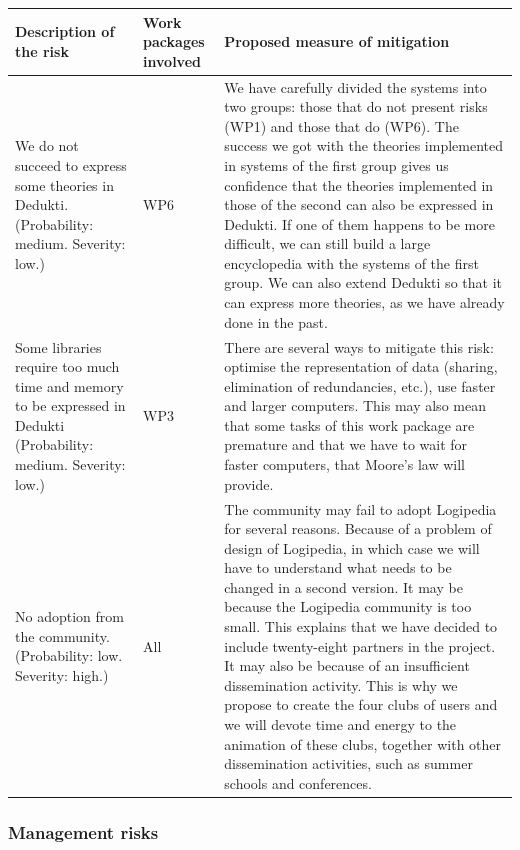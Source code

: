 \begin{longtable*}{|p{0.30\textwidth}|p{0.10\textwidth}|p{0.50\textwidth}|}
\hline
{\bf Description of the risk}
&
{\bf Work packages involved}
&
{\bf Proposed measure of mitigation}
\\
\hline
We do not succeed to express some theories in Dedukti.
(Probability: medium. Severity: low.)

&
WP6
&
We have carefully divided the systems into two groups: those that do not
present risks (WP1) and those that do (WP6). The success we got with the
theories implemented in systems of the first group gives us confidence
that the theories implemented in those of the second can also be
expressed in Dedukti.  If one of them happens to be more difficult, we
can still build a large encyclopedia with the systems of the first
group. We can also extend Dedukti so that it can express more theories,
as we have already done in the past.
\\
\hline
Some libraries require too much time and memory
to be expressed in Dedukti (Probability: medium. Severity: low.)
&
WP3
&
There are several ways to mitigate this risk: optimise the
representation of data (sharing, elimination of redundancies, etc.), 
use faster and larger computers. This may also mean that some tasks
of this work package are premature and that we have to wait for
faster computers, that Moore's law will provide.
\\
\hline
No adoption from the community. (Probability: low. Severity: high.)
&
All 
&
The community may fail to adopt Logipedia for several reasons. Because
of a problem of design of Logipedia, in which case we will have to
understand what needs to be changed in a second version.  It may be
because the Logipedia community is too small.  This explains that we
have decided to include twenty-eight partners in the project.  It may
also be because of an insufficient dissemination activity.  This is
why we propose to create the four clubs of users and we will devote
time and energy to the animation of these clubs, together with other
dissemination activities, such as summer schools and conferences.
\\
\hline
\end{longtable*}

\subsubsection*{Management risks}

